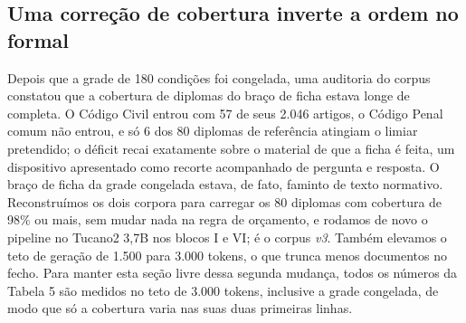\documentclass{IOS-Book-Article}
\begin{document}
\subsection{Uma correção de cobertura inverte a ordem no formal}
Depois que a grade de 180 condições foi congelada, uma auditoria do corpus constatou que a cobertura de diplomas do braço de ficha estava longe de completa. O Código Civil entrou com 57 de seus 2.046 artigos, o Código Penal comum não entrou, e só 6 dos 80 diplomas de referência atingiam o limiar pretendido; o déficit recai exatamente sobre o material de que a ficha é feita, um dispositivo apresentado como recorte acompanhado de pergunta e resposta. O braço de ficha da grade congelada estava, de fato, faminto de texto normativo. Reconstruímos os dois corpora para carregar os 80 diplomas com cobertura de 98\% ou mais, sem mudar nada na regra de orçamento, e rodamos de novo o pipeline no Tucano2 3,7B nos blocos I e VI; é o corpus \emph{v3}. Também elevamos o teto de geração de 1.500 para 3.000 tokens, o que trunca menos documentos no fecho. Para manter esta seção livre dessa segunda mudança, todos os números da Tabela 5 são medidos no teto de 3.000 tokens, inclusive a grade congelada, de modo que só a cobertura varia nas suas duas primeiras linhas.
\end{document}

